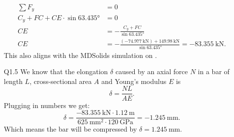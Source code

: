 \begin{derivation}
\begin{itemize}
\begin{align*}
      \sum F_y &= 0 \\
      C_y + FC + CE \cdot \sin \ang{63,435} &= 0 \\
      CE &= - \frac{C_y + FC}{\sin \ang{63,435} } \\
      CE &= - \frac{(-\qty{74.977}{\kN}) + \qty{149.98}{\kN}  }{\sin \ang{63.435} } = \qty{-83,355}{\kN}
    .\end{align*}
    This also aligns with the MDSolids simulation on .
  \item[Q1.5] We know that the elongation $\delta$ caused by an axial force $N$ in a bar of length $L$, cross-sectional area $A$ and Young's modulus $E$ is
      \begin{equation*}
        \delta = \frac{NL}{AE}
      .\end{equation*}
      Plugging in numbers we get:
      \begin{equation*}
        \delta = \frac{- \qty{83.355}{\kN} \cdot \qty{1.12}{\m}}{\qty{625}{\mm^2} \cdot \qty{120}{\GPa} } = \qty{-1.245}{\mm}
      .\end{equation*}
      Which means the bar will be compressed by $\delta = \qty{1,245}{\mm}$. 
  \end{itemize}
\end{derivation}



